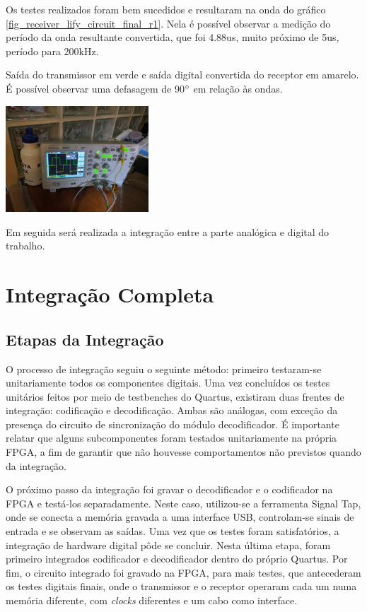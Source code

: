 	Os testes realizados foram bem sucedidos e resultaram na onda do gráfico \ref{fig_receiver_lify_circuit_final_r1}. Nela é possível observar a medição do período da onda resultante convertida, que foi 4.88us, muito próximo de 5us, período para 200kHz.
	
	\begin{chart}[h!]
		\caption{\label{fig_receiver_lify_circuit_final_r1}Saída do transmissor em verde e saída digital convertida do receptor em amarelo. É possível observar uma defasagem de 90$\degree$ em relação às ondas.}
		\centering
		\includegraphics[width=0.4\textwidth, trim={36cm 30cm 60cm 40cm}, clip]{circuits/photos/TXRX_final_fixed.jpg}
	\end{chart}
	
	Em seguida será realizada a integração entre a parte analógica e digital do trabalho.

	\section{Integração Completa}
	
	\subsection{Etapas da Integração}
	O processo de integração seguiu o seguinte método: primeiro testaram-se unitariamente todos os componentes digitais. Uma vez concluídos os testes unitários feitos por meio de testbenches do Quartus, existiram duas frentes de integração: codificação e decodificação. Ambas são análogas, com exceção da presença do circuito de sincronização do módulo decodificador. É importante relatar que alguns subcomponentes foram testados unitariamente na própria FPGA, a fim de garantir que não houvesse comportamentos não previstos quando da integração. 
	
	O próximo passo da integração foi gravar o decodificador e o codificador na FPGA e testá-los separadamente. Neste caso, utilizou-se a ferramenta Signal Tap, onde se conecta a memória gravada a uma interface USB, controlam-se sinais de entrada e se observam as saídas. Uma vez que os testes foram satisfatórios, a integração de hardware digital pôde se concluir. Nesta última etapa, foram primeiro integrados codificador e decodificador dentro do próprio Quartus. Por fim, o circuito integrado foi gravado na FPGA, para mais testes, que antecederam os testes digitais finais, onde o transmissor e o receptor operaram cada um numa memória diferente, com \textit{clocks} diferentes e um cabo como interface.
	
